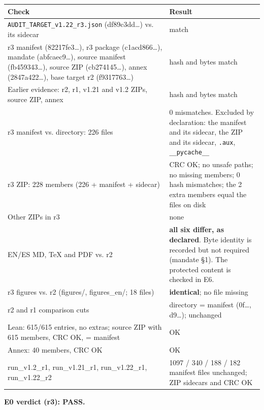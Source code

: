 \documentclass[
]{article}
\newcounter{none} %
\begin{document}
{\def\LTcaptype{none} %
\begin{longtable}[]{@{}ll@{}}
\toprule\noalign{}
Check & Result \\
\midrule\noalign{}
\endhead
\bottomrule\noalign{}
\endlastfoot
\texttt{AUDIT\_TARGET\_v1.22\_r3.json} (df89c3dd\ldots) vs. its sidecar
& match \\
r3 manifest (82217fe3\ldots), r3 package (c1acd866\ldots), mandate
(abfcaec9\ldots), source manifest (fb459343\ldots), source ZIP
(cb274145\ldots), annex (2847a422\ldots), base target r2
(f9317763\ldots) & hash and bytes match \\
Earlier evidence: r2, r1, v1.21 and v1.2 ZIPs, source ZIP, annex & hash
and bytes match \\
r3 manifest vs. directory: 226 files & 0 mismatches. Excluded by
declaration: the manifest and its sidecar, the ZIP and its sidecar,
\texttt{.aux}, \texttt{\_\_pycache\_\_} \\
r3 ZIP: 228 members (226 + manifest + sidecar) & CRC OK; no unsafe
paths; no missing members; 0 hash mismatches; the 2 extra members equal
the files on disk \\
Other ZIPs in r3 & none \\
EN/ES MD, TeX and PDF vs. r2 & \textbf{all six differ, as declared}.
Byte identity is recorded but not required (mandate §1). The protected
content is checked in E6. \\
r3 figures vs. r2 (figures/, figures\_en/; 18 files) &
\textbf{identical}; no file missing \\
r2 and r1 comparison cuts & directory = manifest (0f\ldots, d9\ldots);
unchanged \\
Lean: 615/615 entries, no extras; source ZIP with 615 members, CRC OK, =
manifest & OK \\
Annex: 40 members, CRC OK & OK \\
run\_v1.2\_r1, run\_v1.21\_r1, run\_v1.22\_r1, run\_v1.22\_r2 & 1097 /
340 / 188 / 182 manifest files unchanged; ZIP sidecars and CRC OK \\
\end{longtable}
}

\textbf{E0 verdict (r3): PASS.}
\end{document}
